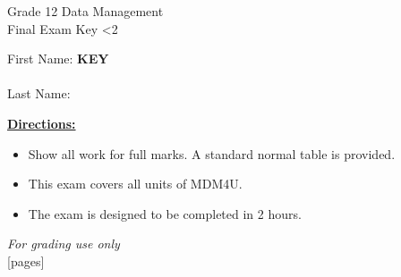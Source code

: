 \documentclass[addpoints]{exam}
\newcommand{\event}{Final Exam}
\newcommand{\tournament}{}
\def\type{0}
\begin{document}
\begin{center}
    {\huge Grade 12 Data Management \\ \event
    \ifprintanswers \space Key
    \else \space \ifnum\type<2 \fi
    \fi \\ \vspace{3mm}\tournament\vspace{1mm}}
\end{center}

\vspace{.20\textheight}

\begin{center}
    First Name: \ifprintanswers
    \underline{\hspace{3.5cm}}\textbf{KEY}\underline{\hspace{5.5cm}}\\\vspace{5mm}
    \else \underline{\hspace{10cm}}\\ \vspace{5mm} \fi
    Last Name: \underline{\hspace{10cm}}\\ \vspace{5mm}
\end{center}

\noindent\textbf{\underline{Directions:}}
\begin{itemize}
    \item Show all work for full marks. A standard normal table is provided.
    \item This exam covers all units of MDM4U.
    \item The exam is designed to be completed in 2 hours.
\end{itemize}
\begin{center}
\textit{For grading use only}\\
[pages]
\end{center}
\end{document}
